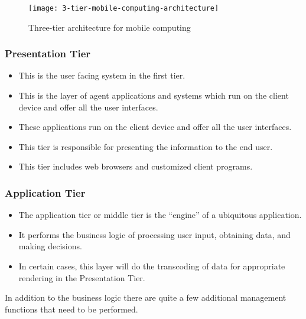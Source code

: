 \begin{figure}[hpt]
	\begin{center}
		\texttt{[image: 3-tier-mobile-computing-architecture]}
		\caption{Three-tier architecture for mobile computing}
		\label{fig:3-tier-mobile-computing-architecture}
	\end{center}
\end{figure}


\begin{multicols}{2}
	\subsubsection{Presentation Tier}
	\begin{itemize}
		\item This is the user facing system in the first tier. 
		\item This is the layer of agent applications and systems which run on the client device and offer all the user interfaces.
		\item These applications run on the client device and offer all the user interfaces. 
		\item This tier is responsible for presenting the information to the end user.
		\item This tier includes web browsers and customized client programs. 
	\end{itemize}
\end{multicols}


\begin{multicols}{2}
	\subsubsection{Application Tier}
	\begin{itemize}
		\item The application tier or middle tier is the ``engine'' of a ubiquitous application. 
		\item It performs the business logic of processing user input, obtaining data, and making decisions. 
		\item In certain cases, this layer will do the transcoding of data for appropriate rendering in the Presentation Tier. 
	\end{itemize}
\end{multicols}

In addition to the business logic there are quite a few additional management functions that need to be performed. 

